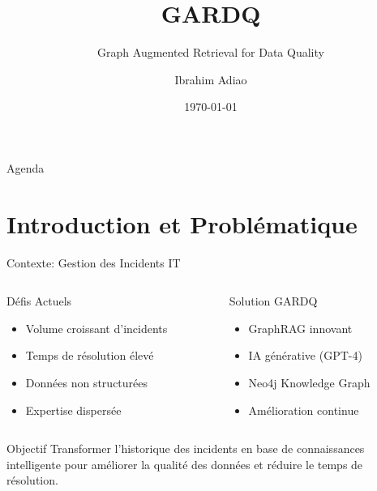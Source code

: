 \documentclass[10pt, aspectratio=169]{beamer}
\title{GARDQ}
\subtitle{Graph Augmented Retrieval for Data Quality}
\author{Ibrahim Adiao}
\date{\today}
\institute{Système Intelligent de Gestion des Incidents IT}
\begin{document}
\begin{frame}
    \titlepage
\end{frame}

\begin{frame}{Agenda}
    \tableofcontents
\end{frame}

\section{Introduction et Problématique}

\begin{frame}{Contexte: Gestion des Incidents IT}
    \begin{columns}[T]
        \begin{column}{0.5\textwidth}
            \begin{block}{Défis Actuels}
                \begin{itemize}
                    \item \faExclamationTriangle{} Volume croissant d'incidents
                    \item \faClock{} Temps de résolution élevé
                    \item \faDatabase{} Données non structurées
                    \item \faUsers{} Expertise dispersée
                \end{itemize}
            \end{block}
        \end{column}
        \begin{column}{0.5\textwidth}
            \begin{block}{Solution GARDQ}
                \begin{itemize}
                    \item \faLightbulb{} GraphRAG innovant
                    \item \faBrain{} IA générative (GPT-4)
                    \item \faProjectDiagram{} Neo4j Knowledge Graph
                    \item \faChartLine{} Amélioration continue
                \end{itemize}
            \end{block}
        \end{column}
    \end{columns}
    
    \vspace{0.5cm}
    \begin{alertblock}{Objectif}
        Transformer l'historique des incidents en base de connaissances intelligente pour améliorer la qualité des données et réduire le temps de résolution.
    \end{alertblock}
\end{frame}
\end{document}

